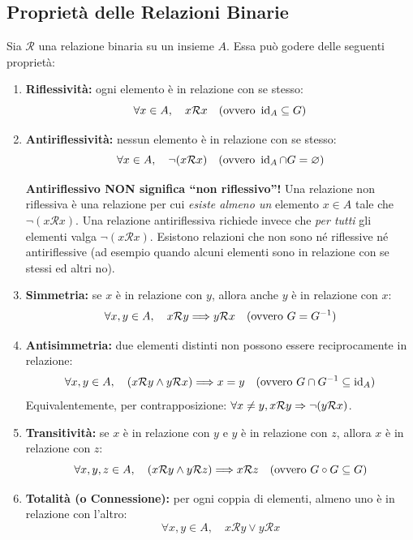 \subsection{Proprietà delle Relazioni Binarie}
Sia $\mathcal{R}$ una relazione binaria su un insieme $A$. Essa può godere delle seguenti proprietà:
\begin{enumerate}
    \item \textbf{Riflessività:} ogni elemento è in relazione con se stesso:
    \[
        \forall x \in A, \quad x \mathcal{R} x \quad (\text{ovvero } \operatorname{id}_A \subseteq G)
    \]
    \item \textbf{Antiriflessività:} nessun elemento è in relazione con se stesso:
    \[
        \forall x \in A, \quad \neg(x \mathcal{R} x) \quad (\text{ovvero } \operatorname{id}_A \cap G = \varnothing)
    \]
    \begin{avvisoCutolo}
        \textbf{Antiriflessivo NON significa ``non riflessivo''!}
        Una relazione non riflessiva è una relazione per cui \emph{esiste almeno un} elemento $x \in A$ tale che $\neg(x \mathcal{R} x)$. Una relazione antiriflessiva richiede invece che \emph{per tutti} gli elementi valga $\neg(x \mathcal{R} x)$. Esistono relazioni che non sono né riflessive né antiriflessive (ad esempio quando alcuni elementi sono in relazione con se stessi ed altri no).
    \end{avvisoCutolo}
    \item \textbf{Simmetria:} se $x$ è in relazione con $y$, allora anche $y$ è in relazione con $x$:
    \[
        \forall x, y \in A, \quad x \mathcal{R} y \Longrightarrow y \mathcal{R} x \quad (\text{ovvero } G = G^{-1})
    \]
    \item \textbf{Antisimmetria:} due elementi distinti non possono essere reciprocamente in relazione:
    \[
        \forall x, y \in A, \quad (x \mathcal{R} y \wedge y \mathcal{R} x) \Longrightarrow x = y \quad (\text{ovvero } G \cap G^{-1} \subseteq \operatorname{id}_A)
    \]
    Equivalentemente, per contrapposizione: $\forall x \neq y, x \mathcal{R} y \Rightarrow \neg(y \mathcal{R} x)$.
    \item \textbf{Transitività:} se $x$ è in relazione con $y$ e $y$ è in relazione con $z$, allora $x$ è in relazione con $z$:
    \[
        \forall x, y, z \in A, \quad (x \mathcal{R} y \wedge y \mathcal{R} z) \Longrightarrow x \mathcal{R} z \quad (\text{ovvero } G \circ G \subseteq G)
    \]
    \item \textbf{Totalità (o Connessione):} per ogni coppia di elementi, almeno uno è in relazione con l'altro:
    \[
        \forall x, y \in A, \quad x \mathcal{R} y \vee y \mathcal{R} x
    \]
\end{enumerate}

